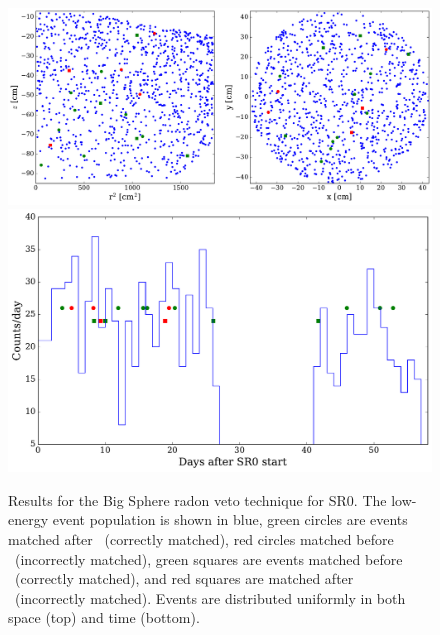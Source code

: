 \begin{figure}[htbp]
\centering
    \includegraphics[width=\textwidth]{figures/rnveto/sr0_bs_results_space}
    \includegraphics[width=\textwidth]{figures/rnveto/sr0_bs_results_time}
    \caption{Results for the Big Sphere radon veto technique for SR0. The low-energy event population is shown in blue, green circles are events matched after \Po~(correctly matched), red circles matched before \Po~(incorrectly matched), green squares are events matched before \BiPo~(correctly matched), and red squares are matched after \BiPo~(incorrectly matched). Events are distributed uniformly in both space (top) and time (bottom).}\label{fig:match_parameters0}
\end{figure}

